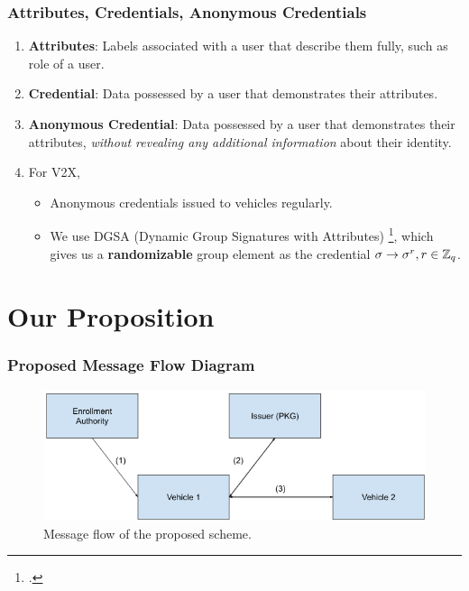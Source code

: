 \documentclass{beamer}
\begin{document}
    \begin{frame}
        \frametitle{Attributes, Credentials, Anonymous Credentials}
        \begin{enumerate}
            \item<1-> \textbf{Attributes}: Labels associated with a user that
            describe them fully, such as role of a user.
            \item<2-> \textbf{Credential}: Data possessed by a user that
            demonstrates their attributes.
            \item<3-> \textbf{Anonymous Credential}: Data possessed by a user
            that demonstrates their attributes, \emph{without revealing any
            additional information} about their identity.
            \item<4-> For V2X,
            \begin{itemize}
                \item Anonymous credentials issued to vehicles regularly.
                \item We use DGSA (Dynamic Group Signatures with Attributes)
                \footcite{camenischZoneEncryptionAnonymous2020}, which gives us
                a \textbf{randomizable} group element as the credential \(\sigma
                \rightarrow \sigma^r, r \in \mathbb Z_q\).
            \end{itemize}
        \end{enumerate}
    \end{frame}

    \section{Our Proposition}
    \begin{frame}
        \frametitle{Proposed Message Flow Diagram}
        \begin{figure}
            \centering
            \includegraphics[width=\columnwidth]{figs/flow.png}
            \caption{Message flow of the proposed scheme.}
            \label{fig:new-flow}
        \end{figure}
    \end{frame}
\end{document}
